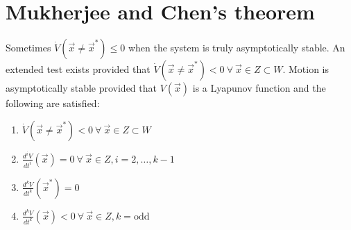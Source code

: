 \section{Mukherjee and Chen's theorem}

Sometimes $\dot{V}(\vec{x}\neq\vec{x}^*) \leq 0$ when the system is truly asymptotically stable. An extended test exists provided that $\dot{V}(\vec{x}\neq\vec{x}^*) < 0 \ \forall \ \vec{x} \in Z \subset W$.
Motion is asymptotically stable provided that $V(\vec{x})$ is a Lyapunov function and the following are satisfied:

\begin{enumerate}
	\item $\dot{V}(\vec{x}\neq\vec{x}^*) < 0 \ \forall \ \vec{x} \in Z \subset W$
	\item $ \frac{d^i V}{dt^i} (\vec{x}) = 0 \ \forall \ \vec{x} \in Z, i = 2,\dots,k-1$
	\item $ \frac{d^k V}{dt^k} (\vec{x}^*) = 0$
	\item $ \frac{d^k V}{dt^k} (\vec{x}) < 0 \ \forall \ \vec{x} \in Z, k = \mathrm{odd}$
\end{enumerate}